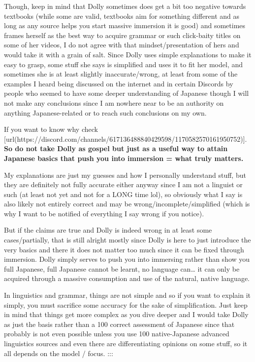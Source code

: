 \thinrule

Though, keep in mind that Dolly sometimes does get a bit too negative towards textbooks (while some are valid, textbooks aim for something different and as long as any source helps you start massive immersion it is good) and sometimes frames herself as the best way to acquire grammar or such click-baity titles on some of her videos, I do not agree with that mindset/presentation of hers and would take it with a grain of salt. Since Dolly uses simple explanations to make it easy to grasp, some stuff she says is simplified and uses it to fit her model, and sometimes she is at least slightly inaccurate/wrong, at least from some of the examples I heard being discussed on the internet and in certain Discords by people who seemed to have some deeper understanding of Japanese though I will not make any conclusions since I am nowhere near to be an authority on anything Japanese-related or to reach such conclusions on my own.

If you want to know why check [url(https://discord.com/channels/617136488840429598/1170582570161950752)]. {\bf So do not take Dolly as gospel but just as a useful way to attain Japanese basics that push you into immersion = what truly matters.}

\thinrule

My explanations are just my guesses and how I personally understand stuff, but they are definitely not fully accurate either anyway since I am not a linguist or such (at least not yet and not for a LONG time lol), so obviously what I say is also likely not entirely correct and may be wrong/incomplete/simplified (which is why I want to be notified of everything I say wrong if you notice).

But if the claims are true and Dolly is indeed wrong in at least some cases/partially, that is still alright mostly since Dolly is here to just introduce the very basics and there it does not matter too much since it can be fixed through immersion. Dolly simply serves to push you into immersing rather than show you full Japanese, full Japanese cannot be learnt, no language can\ldots{} it can only be acquired through a massive consumption and use of the natural, native language.

\thinrule

In linguistics and grammar, things are not simple and so if you want to explain it simply, you must sacrifice some accuracy for the sake of simplification. Just keep in mind that things get more complex as you dive deeper and I would take Dolly as just the basis rather than a 100 correct assessment of Japanese since that probably is not even possible unless you use 100 native-Japanese advanced linguistics sources and even there are differentiating opinions on some stuff, so it all depends on the model / focus. :::

